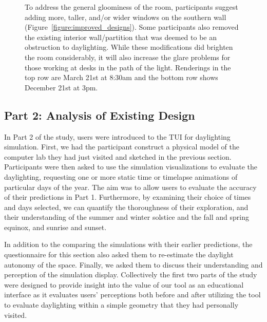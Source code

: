 \documentclass[review]{vgtc}                 %
\begin{document}
\begin{figure}[t]
\vspace{1.7in}

\caption{To address the general gloominess of the room, participants
  suggest adding more, taller, and/or wider windows on the southern
  wall (Figure~\ref{figure:improved_designs}).  Some participants also
  removed the existing interior wall/partition that was deemed to be
  an obstruction to daylighting.  While these modifications did
  brighten the room considerably, it will also increase the glare
  problems for those working at desks in the path of the light.
  Renderings in the top row are March 21st at 8:30am and the bottom
  row shows December 21st at 3pm.}
\label{figure:brighter_renovations}

\vspace{-0.1in}
\end{figure}








\subsection{Part 2: Analysis of Existing Design}

In Part 2 of the study, users were introduced to the TUI for
daylighting simulation.  First, we had the participant construct a
physical model of the computer lab they had just visited and sketched
in the previous section.  Participants were then asked to use the
simulation visualizations to evaluate the daylighting, requesting one
or more static time or timelapse animations of particular days of the
year.  The aim was to allow users to evaluate the accuracy of their
predictions in Part 1.  Furthermore, by examining their choice of
times and days selected, we can quantify the thoroughness of their
exploration, and their understanding of the summer and winter solstice
and the fall and spring equinox, and sunrise and sunset.

In addition to the comparing the simulations with their earlier
predictions, the questionnaire for this section also asked them to
re-estimate the daylight autonomy of the space.  Finally, we asked them
to discuss their understanding and perception of the simulation
display.  Collectively the first two parts of the study were designed
to provide insight into the value of our tool as an educational
interface as it evaluates users' perceptions both before and after
utilizing the tool to evaluate daylighting within a simple geometry
that they had personally visited.
\end{document}
